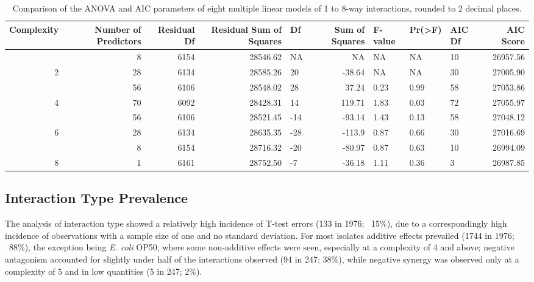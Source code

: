 \documentclass[final,1p,times]{elsarticle}
\begin{document}
\begin{table}[H]
\centering
\scriptsize
\begin{tabular}{N N N N O N O O O N}
\toprule 
\textbf{Complexity} & \textbf{Number of Predictors} & \textbf{Residual Df} & \textbf{Residual Sum of Squares} & \textbf{Df} & \textbf{Sum of Squares} & \textbf{F-value} & \textbf{Pr(>F)} & \textbf{AIC Df} & \textbf{AIC Score}  \\
\midrule
{} & 8 & 6154 & 28546.62 & NA & NA & NA & NA & 10 & 26957.56 \\
{2} & 28 & 6134 & 28585.26 & 20 & -38.64 & NA & NA & 30 & 27005.90 \\
 & 56 & 6106 & 28548.02 & 28 & 37.24 & 0.23 & 0.99 & 58 & 27053.86 \\
{4} & 70 & 6092 & 28428.31 & 14 & 119.71 & 1.83 & 0.03 & 72 & 27055.97 \\
 & 56 & 6106 & 28521.45 & -14 & -93.14 & 1.43 & 0.13 & 58 & 27048.12 \\
{6} & 28 & 6134 & 28635.35 & -28 & -113.9 & 0.87 & 0.66 & 30 & 27016.69 \\
 & 8 & 6154 & 28716.32 & -20 & -80.97 & 0.87 & 0.63 & 10 & 26994.09 \\
{8} & 1 & 6161 & 28752.50 & -7 & -36.18 & 1.11 & 0.36 & 3 & 26987.85 \\
\bottomrule
\end{tabular}
\caption{Comparison of the ANOVA and AIC parameters of eight multiple linear models of 1 to 8-way interactions, rounded to 2 decimal places.}
\label{tab:lmodels}
\end{table}

\newpage
\subsection{Interaction Type Prevalence}
\label{S:3:6}

The analysis of interaction type showed a relatively high incidence of T-test errors (133 in 1976; ~15\%), due to a correspondingly high incidence of observations with a sample size of one and no standard deviation. For most isolates additive effects prevailed (1744 in 1976; ~88\%), the exception being \textit{E. coli} OP50, where some non-additive effects were seen, especially at a complexity of 4 and above; negative antagonism accounted for slightly under half of the interactions observed (94 in 247; 38\%), while negative synergy was observed only at a complexity of 5 and in low quantities (5 in 247; 2\%).
\end{document}
